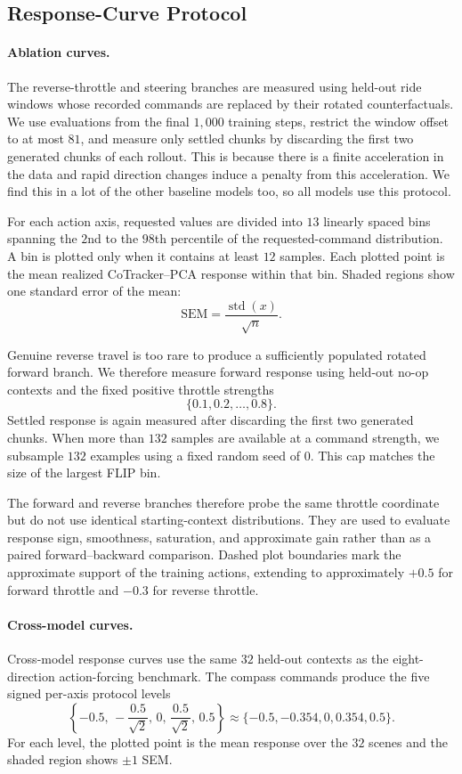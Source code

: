 \subsection{Response-Curve Protocol}
\label{app:response_details}

\paragraph{Ablation curves.}
The reverse-throttle and steering branches are measured using held-out ride
windows whose recorded commands are replaced by their rotated
counterfactuals. We use evaluations from the final $1{,}000$ training steps,
restrict the window offset to at most $81$, and measure only settled chunks by
discarding the first two generated chunks of each rollout. This is because there is a finite acceleration in the data and rapid direction changes induce a penalty from this acceleration. We find this in a lot of the other baseline models too, so all models use this protocol.

For each action axis, requested values are divided into $13$ linearly spaced
bins spanning the $2$nd to the $98$th percentile of the requested-command
distribution. A bin is plotted only when it contains at least $12$ samples.
Each plotted point is the mean realized CoTracker--PCA response within that
bin. Shaded regions show one standard error of the mean:
\[
\mathrm{SEM}
=
\frac{\operatorname{std}(x)}{\sqrt{n}}.
\]

Genuine reverse travel is too rare to produce a sufficiently populated
rotated forward branch. We therefore measure forward response using
held-out no-op contexts and the fixed positive throttle strengths
\[
\{0.1,0.2,\ldots,0.8\}.
\]
Settled response is again measured after discarding the first two generated
chunks. When more than $132$ samples are available at a command strength, we
subsample $132$ examples using a fixed random seed of $0$. This cap matches
the size of the largest FLIP bin.

The forward and reverse branches therefore probe the same throttle coordinate
but do not use identical starting-context distributions. They are used to
evaluate response sign, smoothness, saturation, and approximate gain rather
than as a paired forward--backward comparison. Dashed plot boundaries mark
the approximate support of the training actions, extending to approximately
$+0.5$ for forward throttle and $-0.3$ for reverse throttle.

\paragraph{Cross-model curves.}
Cross-model response curves use the same $32$ held-out contexts as the
eight-direction action-forcing benchmark. The compass commands produce the
five signed per-axis protocol levels
\[
\left\{
-0.5,\,
-\frac{0.5}{\sqrt{2}},\,
0,\,
\frac{0.5}{\sqrt{2}},\,
0.5
\right\}
\approx
\{-0.5,-0.354,0,0.354,0.5\}.
\]
For each level, the plotted point is the mean response over the $32$ scenes
and the shaded region shows $\pm1$ SEM.

